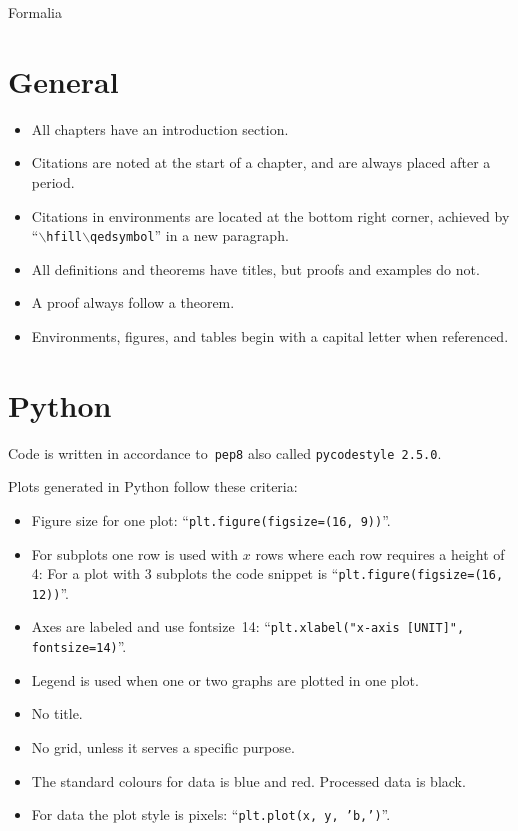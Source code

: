 \begin{center}
{\Huge Formalia}
\end{center}
\section{General}
\begin{itemize}
    \item All chapters have an introduction section.
    \item Citations are noted at the start of a chapter, and are always placed after a period.
    \item Citations in environments are located at the bottom right corner, achieved by\newline
    ``\texttt{\(\backslash\)hfill\(\backslash\)qedsymbol}'' in a new paragraph.
    \item All definitions and theorems have titles, but proofs and examples do not.
    \item A proof always follow a theorem.
    \item Environments, figures, and tables begin with a capital letter when referenced.
\end{itemize}

\section{Python}
Code is written in accordance to~\texttt{pep8} also called \texttt{pycodestyle 2.5.0}.

Plots generated in Python follow these criteria:
\begin{itemize}
    \item Figure size for one plot: \hfill``\texttt{plt.figure(figsize=(16, 9))}''.
    \item For subplots one row is used with \(x\) rows where each row requires a height of 4: For a plot with 3 subplots the code snippet is \hfill``\texttt{plt.figure(figsize=(16, 12))}''.
    \item Axes are labeled and use fontsize~14: \hfill``\texttt{plt.xlabel("x-axis [UNIT]", fontsize=14)}''.
    \item Legend is used when one or two graphs are plotted in one plot.
    \item No title.
    \item No grid, unless it serves a specific purpose.
    \item The standard colours for data is blue and red. Processed data is black.
    \item For data the plot style is pixels: \hfill``\texttt{plt.plot(x, y, 'b,')}''.
\end{itemize}
